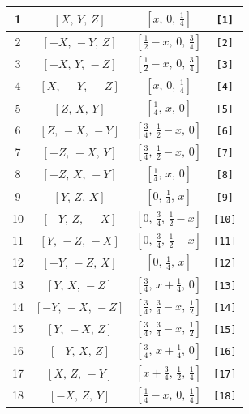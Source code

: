 \documentclass[fleqn,8pt]{jsarticle}
\begin{document}
\begin{longtable}{cccc}
1 & $\left[ X,\, Y,\, Z \right]$ & $\left[ x,\, 0,\, \frac{1}{4} \right]$ & {\tt [1]} \\ \hline
2 & $\left[ - X,\, - Y,\, Z \right]$ & $\left[ \frac{1}{2} - x,\, 0,\, \frac{3}{4} \right]$ & {\tt [2]} \\ \hline
3 & $\left[ - X,\, Y,\, - Z \right]$ & $\left[ \frac{1}{2} - x,\, 0,\, \frac{3}{4} \right]$ & {\tt [3]} \\ \hline
4 & $\left[ X,\, - Y,\, - Z \right]$ & $\left[ x,\, 0,\, \frac{1}{4} \right]$ & {\tt [4]} \\ \hline
5 & $\left[ Z,\, X,\, Y \right]$ & $\left[ \frac{1}{4},\, x,\, 0 \right]$ & {\tt [5]} \\ \hline
6 & $\left[ Z,\, - X,\, - Y \right]$ & $\left[ \frac{3}{4},\, \frac{1}{2} - x,\, 0 \right]$ & {\tt [6]} \\ \hline
7 & $\left[ - Z,\, - X,\, Y \right]$ & $\left[ \frac{3}{4},\, \frac{1}{2} - x,\, 0 \right]$ & {\tt [7]} \\ \hline
8 & $\left[ - Z,\, X,\, - Y \right]$ & $\left[ \frac{1}{4},\, x,\, 0 \right]$ & {\tt [8]} \\ \hline
9 & $\left[ Y,\, Z,\, X \right]$ & $\left[ 0,\, \frac{1}{4},\, x \right]$ & {\tt [9]} \\ \hline
10 & $\left[ - Y,\, Z,\, - X \right]$ & $\left[ 0,\, \frac{3}{4},\, \frac{1}{2} - x \right]$ & {\tt [10]} \\ \hline
11 & $\left[ Y,\, - Z,\, - X \right]$ & $\left[ 0,\, \frac{3}{4},\, \frac{1}{2} - x \right]$ & {\tt [11]} \\ \hline
12 & $\left[ - Y,\, - Z,\, X \right]$ & $\left[ 0,\, \frac{1}{4},\, x \right]$ & {\tt [12]} \\ \hline
13 & $\left[ Y,\, X,\, - Z \right]$ & $\left[ \frac{3}{4},\, x + \frac{1}{4},\, 0 \right]$ & {\tt [13]} \\ \hline
14 & $\left[ - Y,\, - X,\, - Z \right]$ & $\left[ \frac{3}{4},\, \frac{3}{4} - x,\, \frac{1}{2} \right]$ & {\tt [14]} \\ \hline
15 & $\left[ Y,\, - X,\, Z \right]$ & $\left[ \frac{3}{4},\, \frac{3}{4} - x,\, \frac{1}{2} \right]$ & {\tt [15]} \\ \hline
16 & $\left[ - Y,\, X,\, Z \right]$ & $\left[ \frac{3}{4},\, x + \frac{1}{4},\, 0 \right]$ & {\tt [16]} \\ \hline
17 & $\left[ X,\, Z,\, - Y \right]$ & $\left[ x + \frac{3}{4},\, \frac{1}{2},\, \frac{1}{4} \right]$ & {\tt [17]} \\ \hline
18 & $\left[ - X,\, Z,\, Y \right]$ & $\left[ \frac{1}{4} - x,\, 0,\, \frac{1}{4} \right]$ & {\tt [18]} \\ \hline

\end{longtable}
\end{document}
